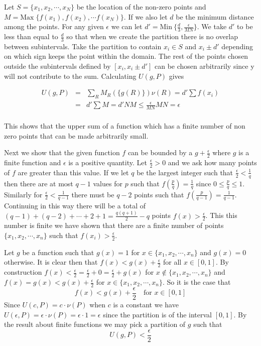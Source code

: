 \documentclass[11pt,reqno]{article}
\begin{document}
Let $S = \{ x_1, x_2,\cdots,x_N \}$ be the location of the non-zero points and $M = \text{Max} \;\{ f(x_1),f(x_2), \cdots f(x_N) \}$. If we also let $d$ be the minimum distance among the points. For any given $\epsilon$ we can let $d' = \text{Min} \: \{ \frac{d}{3}, \frac{\epsilon}{M N} \} $. We take $d'$ to be less than equal to $\frac{d}{3}$ so that when we create the partition there is no overlap between subintervals. Take the partition to contain $x_i \in S$ and $x_i \pm d'$ depending on which sign keeps the point within the domain. The rest of the points chosen outside the subintervals defined by $[x_i,x_i \pm d']$ can be chosen arbitrarily since y will not contribute to the sum. Calculating $U(g,P)$ gives

\begin{eqnarray*}
U(g,P) &=& \sum_R M_R( \{ g(R) \}) \nu(R) = d' \sum f(x_i) \\
&=& d' \sum M = d' N M \le \frac{\epsilon}{MN} MN = \epsilon \\
\end{eqnarray*}

This shows that the upper sum of a function which has a finite number of non zero points that can be made arbitrarily small.

Next we show that the given function $f$ can be bounded by a $g + \frac{\epsilon}{2}$ where $g$ is a finite function and $\epsilon$ is a positive quantity.
	Let $\frac{\epsilon}{2} > 0$ and we ask how many points of $f$ are greater than this value. If we let $q$ be the largest integer such that $\frac{\epsilon}{2} < \frac{1}{q}$ then there are at most $q-1$ values for $p$ such that $f(\frac{p}{q}) = \frac{1}{q}$ since $0 \le \frac{p}{q} \le 1$. Similarly for $\frac{\epsilon}{2} < \frac{1}{q-1}$ there must be $q-2$ points such that $f(\frac{p}{q-1}) = \frac{1}{q-1}$. Continuing in this way there will be a total of $(q-1) + (q-2) + \cdots + 2 + 1 = \frac{q(q+1)}{2} - q$ points $f(x) > \frac{\epsilon}{2}$. This this number is finite we have shown that there are a finite number of points $\{ x_1,x_2,\cdots, x_n \}$ such that $f(x_i) > \frac{\epsilon}{2}$.

Let $g$ be a function such that $g(x) = 1$ for $x \in \{ x_1,x_2,\cdots,x_n \}$ and $g(x) = 0$ otherwise. It is clear then that $f(x) < g(x) + \frac{\epsilon}{2}$ for all $x \in [0,1]$. By construction $f(x) < \frac{\epsilon}{2} = \frac{\epsilon}{2} + 0 =  \frac{\epsilon}{2} + g(x)$ for $x \notin \{ x_1,x_2,\cdots, x_n \}$ and $f(x) = g(x) < g(x) + \frac{\epsilon}{2}$ for $x \in \{ x_1,x_2,\cdots, x_n \}$. So it is the case that
\[ f(x) < g(x) + \frac{\epsilon}{2} \quad \text{for $x \in [0,1]$} \]
Since $U(c,P) = c \cdot \nu (P)$ when $c$ is a constant we have $U(\epsilon,P) = \epsilon \cdot \nu(P) = \epsilon \cdot 1 = \epsilon$ since the partition is of the interval $[0,1]$. By the result about finite functions we may pick a partition of $g$ such that
\[ U(g,P) < \frac{\epsilon}{2} \]
\end{document}
